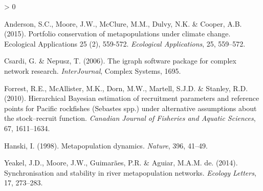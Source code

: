 \documentclass[
]{article}
\newlength{\cslhangindent}
\newenvironment{CSLReferences}[2] %
 {%
  \setlength{\parindent}{0pt}
  \ifodd #1 \everypar{\setlength{\hangindent}{\cslhangindent}}\ignorespaces\fi
  \ifnum #2 > 0
  \setlength{\parskip}{#2\baselineskip}
  \fi
 }%
 {}
\begin{document}
\hypertarget{refs}{}
\begin{CSLReferences}{1}{0}
\leavevmode\hypertarget{ref-Anderson2015}{}%
Anderson, S.C., Moore, J.W., McClure, M.M., Dulvy, N.K. \& Cooper, A.B.
(2015). {Portfolio conservation of metapopulations under climate change.
Ecological Applications 25 (2), 559-572.} \emph{Ecological
Applications}, 25, 559--572.

\leavevmode\hypertarget{ref-igraph2006}{}%
Csardi, G. \& Nepusz, T. (2006). The igraph software package for complex
network research. \emph{InterJournal}, Complex Systems, 1695.

\leavevmode\hypertarget{ref-Forrest2010}{}%
Forrest, R.E., McAllister, M.K., Dorn, M.W., Martell, S.J.D. \& Stanley,
R.D. (2010). {Hierarchical Bayesian estimation of recruitment parameters
and reference points for Pacific rockfishes (Sebastes spp.) under
alternative assumptions about the stock--recruit function}.
\emph{Canadian Journal of Fisheries and Aquatic Sciences}, 67,
1611--1634.

\leavevmode\hypertarget{ref-Hanski1998}{}%
Hanski, I. (1998). {Metapopulation dynamics}. \emph{Nature}, 396,
41--49.

\leavevmode\hypertarget{ref-Yeakel2014}{}%
Yeakel, J.D., Moore, J.W., Guimarães, P.R. \& Aguiar, M.A.M. de. (2014).
{Synchronisation and stability in river metapopulation networks}.
\emph{Ecology Letters}, 17, 273--283.

\end{CSLReferences}
\end{document}
